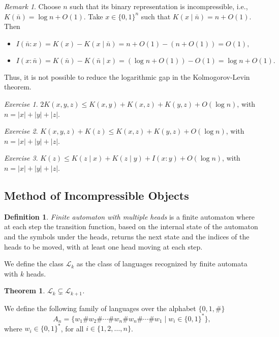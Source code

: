 \documentclass[12pt,sans]{article}
\newcommand{\bits}{\{0,1\}}
\newcommand{\bitstr}{\bits^*}
\theoremstyle{definition}
\newtheorem{definition}{Definition}[section]
\theoremstyle{plain}
\newtheorem{theorem}{Theorem}[section]
\theoremstyle{remark}
\newtheorem{exercise}{Exercise}[section]
\newtheorem{remark}{Remark}[section]
\begin{document}
\begin{remark}
    Choose $n$ such that its binary representation is incompressible, i.e., $K(\bar n) = \log n + O(1)$. Take $x \in \{0,1\}^n$ such that $K(x \mid \bar n) = n + O(1)$. Then
    \begin{itemize}
        \item\(
        I(\bar n : x) = K(x) - K(x \mid \bar n) = n + O(1) - (n + O(1)) = O(1),
        \)
        \item\(
        I(x : \bar n) = K(\bar n) - K(\bar n \mid x) = (\log n + O(1)) - O(1) = \log n + O(1).
        \)
    \end{itemize}
    Thus, it is not possible to reduce the logarithmic gap in the Kolmogorov-Levin theorem.
\end{remark}

\begin{exercise}
    $2K(x,y,z) \le K(x,y) + K(x,z) + K(y,z) + O(\log n)$, with $n = |x| + |y| + |z|$.
\end{exercise}

\begin{exercise}
    $K(x,y,z) + K(z) \le K(x,z) + K(y,z) + O(\log n)$, with $n = |x| + |y| + |z|$.
\end{exercise}

\begin{exercise}
    $K(z) \le K(z \mid x) + K(z \mid y) + I(x:y) + O(\log n)$, with $n = |x| + |y| + |z|$.
\end{exercise}


\subsection{Method of Incompressible Objects}
\begin{definition}
    \emph{Finite automaton with multiple heads} is a finite automaton where at each step the transition function, based on the internal state of the automaton and the symbols under the heads, returns the next state and the indices of the heads to be moved, with at least one head moving at each step.
\end{definition}

We define the class $\mathcal{L}_k$ as the class of languages recognized by finite automata with $k$ heads.

\begin{theorem}\label{thm:kDFA}
    $\mathcal{L}_k \subsetneq \mathcal{L}_{k+1}$.
\end{theorem}

We define the following family of languages over the alphabet $\{0,1,\#\}$
\[
A_n = \{w_1\#w_2\#\dotsb\#w_n\#w_n\#\dotsb\#w_1 \mid w_i \in \bitstr\},
\]
where $w_i \in \bitstr$, for all $i \in \{1,2,\dotsc,n\}$.
\end{document}
